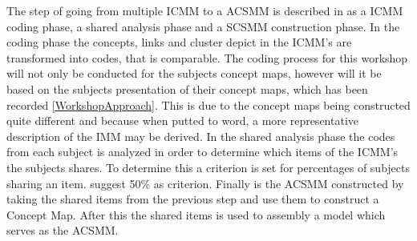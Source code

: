 The step of going from multiple ICMM to a ACSMM is described in \textcite{WEB:ConceptMapAnalysis} as a ICMM coding phase, a shared analysis phase and a SCSMM construction phase. In the coding phase the concepts, links and cluster depict in the ICMM's are transformed into codes, that is comparable. The coding process for this workshop will not only be conducted for the subjects concept maps, however will it be based on the subjects presentation of their concept maps, which has been recorded \autoref{WorkshopApproach}. This is due to the concept maps being constructed quite different and because when putted to word, a more representative description of the IMM may be derived. In the shared analysis phase the codes from each subject is analyzed in order to determine which items of the ICMM's the subjects shares. To determine this a criterion is set for percentages of subjects sharing an item. \textcite{WEB:ConceptMapAnalysis} suggest 50\% as criterion. Finally is the ACSMM constructed by taking the shared items from the previous step and use them to construct a Concept Map. After this the shared items is used to assembly a model which serves as the ACSMM. 
































